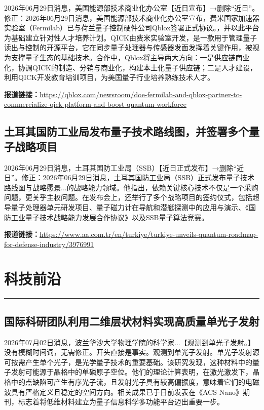 \documentclass[12pt,a4paper]{ctexart}
\begin{document}
2026年06月29日消息，美国能源部技术商业化办公室【近日宣布】→删除“近日”。修正：2026年06月29日消息，美国能源部技术商业化办公室宣布，费米国家加速器实验室（Fermilab）已与荷兰量子控制硬件公司Qblox签署正式协议。，并以此平台为基础建立针对性人才培养计划。QICK由费米实验室开发，是一款用于管理量子读出与控制的开源平台，它在同步量子处理器与传感器发面发挥着关键作用，被视为支撑量子生态的基础技术。合作中，Qblox将主导两大方向：一是供应链商业化，协调QICK的制造、分销与商业化，构建本土化量子供应链；二是人才建设，利用QICK开发教育培训项目，为美国量子行业培养熟练技术人才。

\noindent\textbf{报道链接：}\url{https://qblox.com/newsroom/doe-fermilab-and-qblox-partner-to-commercialize-qick-platform-and-boost-quantum-workforce}

\subsection{ 土耳其国防工业局发布量子技术路线图，并签署多个量子战略项目 }

2026年06月29日消息，土耳其国防工业局（SSB）【近日正式发布】→删除“近日”。修正：2026年06月29日消息，土耳其国防工业局（SSB）正式发布量子技术路线图与战略愿景...的战略能力领域。他指出，依赖关键核心技术不仅是一个采购问题，更关乎主权问题。在发布会上，还举行了多个战略项目的签约仪式，包括超导量子处理器单元研发项目、量子磁力计在导航和潜艇探测中的应用与演示、《国防工业量子技术战略能力发展合作协议》以及SSB量子算法竞赛。

\noindent\textbf{报道链接：}\url{https://www.aa.com.tr/en/turkiye/turkiye-unveils-quantum-roadmap-for-defense-industry/3976991}


\newpage
\section{科技前沿}
\vspace{-0.5em}
\noindent\rule{\linewidth}{1.5pt}

\subsection{ 国际科研团队利用二维层状材料实现高质量单光子发射 }

2026年07月02日消息，波兰华沙大学物理学院的科学家...【观测到单光子发射。】没有模糊时间词，无需修正。开头直接是事实。观测到单光子发射。单光子发射源可按需产生单个光子，是光学量子技术的重要基础。该研究发现，这种材料中的量子发射可能源于晶格中的单磷原子空位。他们的理论计算表明，在激光激发下，晶格中的点缺陷可产生有序光子流，且发射光子具有较高偏振度，意味着它们的电磁波具有严格定义且稳定的空间方向。相关成果已于日前发表在《ACS Nano》期刊，标志着将低维材料建立为量子信息科学多功能平台迈出重要一步。
\end{document}
